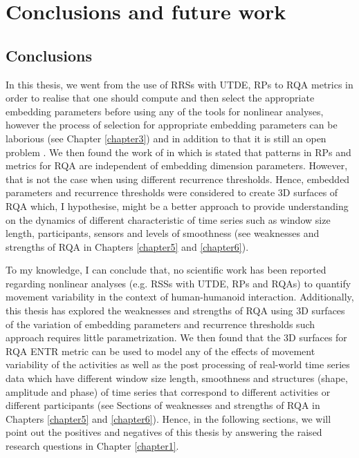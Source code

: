 \chapter{Conclusions and future work}

\section{Conclusions}
In this thesis, we went from the use of RRSs with UTDE, RPs to 
RQA metrics in order to realise
that one should compute and then select the appropriate embedding parameters 
before using any of the tools for nonlinear analyses, however the process of 
selection for appropriate embedding parameters can be laborious 
(see Chapter \ref{chapter3}) and in addition to that it is still an 
open problem \citep{gomezgarcia2014}.
We then found the work of \citep{iwanski1998} in which is stated that 
patterns in RPs and metrics for RQA are independent of embedding 
dimension parameters. However, that is not the case when using different 
recurrence thresholds. 
Hence, embedded parameters and recurrence thresholds were considered 
to create 3D surfaces of RQA which, I hypothesise, might be a better approach
to provide understanding on the dynamics of different characteristic of 
time series 
such as window size length, participants, sensors and levels of smoothness
(see weaknesses and strengths of RQA in Chapters \ref{chapter5} and 
\ref{chapter6}).

To my knowledge, I can conclude that, no scientific work has been reported 
regarding nonlinear analyses (e.g. RSSs with UTDE, RPs and RQAs) to 
quantify movement variability in the context of human-humanoid interaction.
Additionally, this thesis has explored the weaknesses and strengths of RQA
using 3D surfaces of the variation of embedding parameters and recurrence
thresholds such approach requires little parametrization.
We then found that the 3D surfaces for RQA ENTR metric can be used 
to model any of the effects of movement variability of the activities 
as well as the post processing of real-world time series data 
which have different window size length,
smoothness and structures (shape, amplitude and phase) of time series
that correspond to different activities or different participants
(see Sections of weaknesses and strengths of RQA in Chapters 
\ref{chapter5} and \ref{chapter6}).
Hence, in the following sections, we will point out the positives
and negatives of this thesis by answering the raised research questions 
in Chapter \ref{chapter1}.



